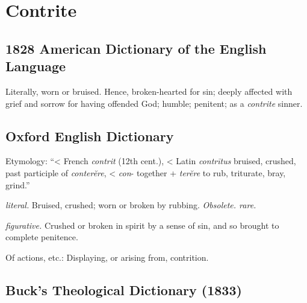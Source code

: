 \section{Contrite}
	\label{CONTRITE}
	

\subsection{1828 American Dictionary of the English Language} %
	\label{CONTRITE-1828}

	\begin{compactitem}
		\item Literally, worn or bruised. Hence, broken-hearted for sin; deeply affected with grief and sorrow for having offended God; humble; penitent; as a \textit{contrite} sinner.
	\end{compactitem}

\subsection{Oxford English Dictionary} %
	\label{CONTRITE-OED}
	
	Etymology: ``< French \textit{contrit} (12th cent.), < Latin \textit{contrītus} bruised, crushed, past participle of \textit{conterĕre}, < \textit{con}- together + \textit{terĕre} to rub, triturate, bray, grind.''

	\begin{compactitem}
		\item[1] \textit{literal.} Bruised, crushed; worn or broken by rubbing. \textit{Obsolete. rare.}
		\item[2.a] \textit{figurative.} Crushed or broken in spirit by a sense of sin, and so brought to complete penitence.
		\item[2.b] Of actions, etc.: Displaying, or arising from, contrition.
	\end{compactitem}
	
\subsection{Buck's Theological Dictionary (1833)} %
	\label{CONTRITE-BTD}

